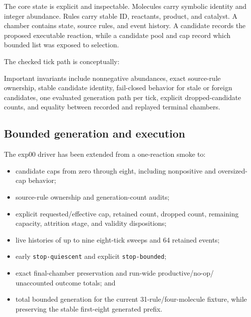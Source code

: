 \documentclass[11pt]{article}
\newcommand{\code}[1]{\texttt{#1}}
\begin{document}
The core state is explicit and inspectable.  Molecules carry symbolic identity
and integer abundance.  Rules carry stable ID, reactants, product, and catalyst.
A chamber contains state, source rules, and event history.  A candidate records
the proposed executable reaction, while a candidate pool and cap record which
bounded list was exposed to selection.

The checked tick path is conceptually:

\begin{center}
\end{center}

Important invariants include nonnegative abundances, exact source-rule
ownership, stable candidate identity, fail-closed behavior for stale or foreign
candidates, one evaluated generation path per tick, explicit dropped-candidate
counts, and equality between recorded and replayed terminal chambers.

\subsection{Bounded generation and execution}

The exp00 driver has been extended from a one-reaction smoke to:

\begin{itemize}
\item candidate caps from zero through eight, including nonpositive and
  oversized-cap behavior;
\item source-rule ownership and generation-count audits;
\item explicit requested/effective cap, retained count, dropped count,
  remaining capacity, attrition stage, and validity dispositions;
\item live histories of up to nine eight-tick sweeps and 64 retained events;
\item early \code{stop-quiescent} and explicit \code{stop-bounded};
\item exact final-chamber preservation and run-wide productive/no-op/
  unaccounted outcome totals; and
\item total bounded generation for the current 31-rule/four-molecule fixture,
  while preserving the stable first-eight generated prefix.
\end{itemize}
\end{document}
